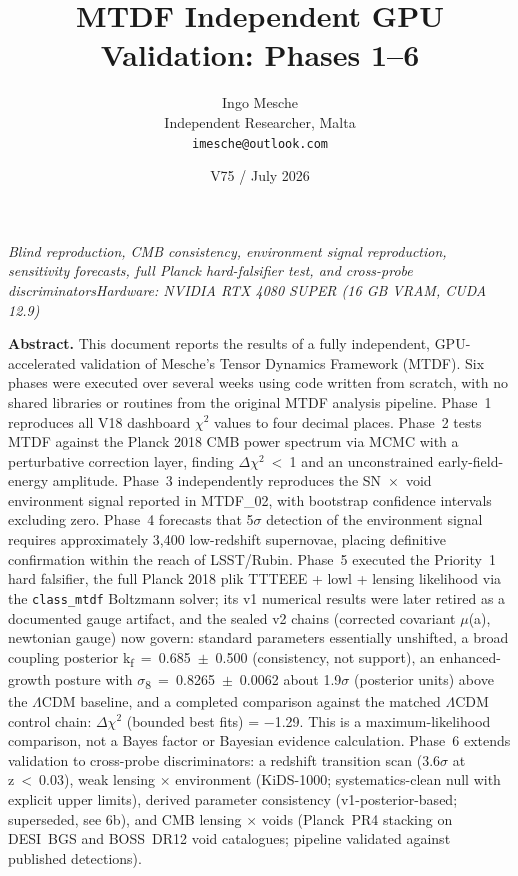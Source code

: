 \documentclass[11pt,a4paper]{article}
\title{MTDF Independent GPU Validation: Phases 1--6}
\author{Ingo Mesche\\ \small Independent Researcher, Malta \\ \small \texttt{imesche@outlook.com}}
\date{V75 / July 2026}
\begin{document}
\maketitle
\begin{center}\itshape Blind reproduction, CMB consistency, environment signal reproduction, sensitivity forecasts, full Planck hard-falsifier test, and cross-probe discriminatorsHardware: NVIDIA RTX 4080 SUPER (16 GB VRAM, CUDA 12.9)\end{center}



\begin{mdframed}[linecolor=accent,linewidth=0.5pt,backgroundcolor=callout-bg,leftline=true,rightline=true,topline=true,bottomline=true,innerleftmargin=8pt,innerrightmargin=8pt,innertopmargin=6pt,innerbottommargin=6pt]
\textbf{Abstract.}
This document reports the results of a fully independent, GPU-accelerated validation of Mesche's Tensor Dynamics Framework (MTDF). Six phases were executed over several weeks using code written from scratch, with no shared libraries or routines from the original MTDF analysis pipeline. Phase~1 reproduces all V18 dashboard $\chi$$^{2}$ values to four decimal places. Phase~2 tests MTDF against the Planck 2018 CMB power spectrum via MCMC with a perturbative correction layer, finding $\Delta$$\chi$$^{2}$~<~1 and an unconstrained early-field-energy amplitude. Phase~3 independently reproduces the SN~$\times$~void environment signal reported in MTDF\_\allowbreak{}02, with bootstrap confidence intervals excluding zero. Phase~4 forecasts that 5$\sigma$ detection of the environment signal requires approximately 3,400 low-redshift supernovae, placing definitive confirmation within the reach of LSST/\allowbreak{}Rubin. Phase~5 executed the Priority~1 hard falsifier, the full Planck 2018 plik TTTEEE + lowl + lensing likelihood via the \texttt{class\_\allowbreak{}mtdf} Boltzmann solver; its v1 numerical results were later retired as a documented gauge artifact, and the sealed v2 chains (corrected covariant $\mu$(a), newtonian gauge) now govern: standard parameters essentially unshifted, a broad coupling posterior k\textsubscript{f}~=~0.685~$\pm$~0.500 (consistency, not support), an enhanced-growth posture with $\sigma$\textsubscript{8}~=~0.8265~$\pm$~0.0062 about 1.9$\sigma$ (posterior units) above the $\Lambda$CDM baseline, and a completed comparison against the matched $\Lambda$CDM control chain: $\Delta$$\chi$$^{2}$ (bounded best fits) = $-$1.29. This is a maximum-likelihood comparison, not a Bayes factor or Bayesian evidence calculation. Phase~6 extends validation to cross-probe discriminators: a redshift transition scan (3.6$\sigma$ at z~<~0.03), weak lensing $\times$ environment (KiDS-1000; systematics-clean null with explicit upper limits), derived parameter consistency (v1-posterior-based; superseded, see 6b), and CMB lensing $\times$ voids (Planck~PR4 stacking on DESI~BGS and BOSS~DR12 void catalogues; pipeline validated against published detections).
\end{mdframed}
\end{document}
